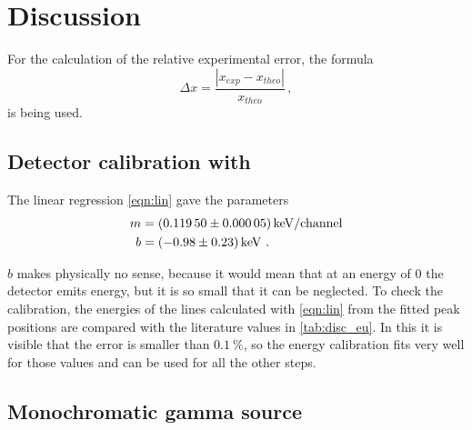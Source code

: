 \section{Discussion}
\label{sec:Discussion}

For the calculation of the relative experimental error, the formula
\begin{equation}
    \Delta x =   \frac{ \left| x_{exp} - x_{theo} \right|   }{x_{theo}} \, ,
    \label{eq:abweichung}
\end{equation}
is being used.

\subsection{Detector calibration with \texorpdfstring{}{152Eu}}

The linear regression \autoref{eqn:lin} gave the parameters
\begin{align}
    m &= \SI{0.11950 \pm 0.00005}{keV}\text{/channel} \\
    b &= \SI{-0.98 \pm 0.23}{keV} \ .
\end{align}

$b$ makes physically no sense, because it would mean that at an energy of 0 the detector emits energy, but it is so small that it can be neglected.
To check the calibration, the energies of the  lines calculated with \autoref{eqn:lin} from the fitted peak positions are compared with the literature values in \autoref{tab:disc_eu}.
In this it is visible that the error is smaller than $\SI{0.1}{\%}$, so the energy calibration fits very well for those values and can be used for all the other steps.


\subsection{Monochromatic gamma source \texorpdfstring{}{137Cs}}


